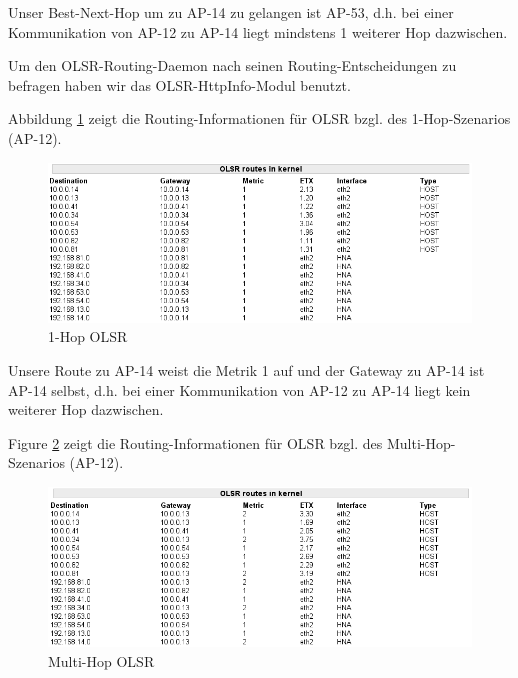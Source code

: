 \documentclass[a4paper,10pt]{article}
\begin{document}
Unser Best-Next-Hop um zu AP-14 zu gelangen ist AP-53, d.h. bei einer Kommunikation von AP-12 zu AP-14 liegt mindstens 1 weiterer Hop dazwischen.

Um den OLSR-Routing-Daemon nach seinen Routing-Entscheidungen zu befragen haben wir das OLSR-HttpInfo-Modul benutzt.

Abbildung \ref{1hop_olsr} zeigt die Routing-Informationen für OLSR bzgl. des 1-Hop-Szenarios (AP-12).

\begin{center}
  \begin{figure}[thb]
    \includegraphics[width=1\textwidth]{1hop_olsr.png}
    \caption{1-Hop OLSR}
    \label{1hop_olsr}
  \end{figure}
\end{center}

Unsere Route zu AP-14 weist die Metrik 1 auf und der Gateway zu AP-14 ist AP-14 selbst, d.h. bei einer Kommunikation von AP-12 zu AP-14 liegt kein weiterer Hop dazwischen.

Figure \ref{2hop_olsr} zeigt die Routing-Informationen für OLSR bzgl. des Multi-Hop-Szenarios (AP-12).

\begin{center}
  \begin{figure}[thb]
    \includegraphics[width=1\textwidth]{2hop_olsr.png}
    \caption{Multi-Hop OLSR}
    \label{2hop_olsr}
  \end{figure}
\end{center}
\end{document}
